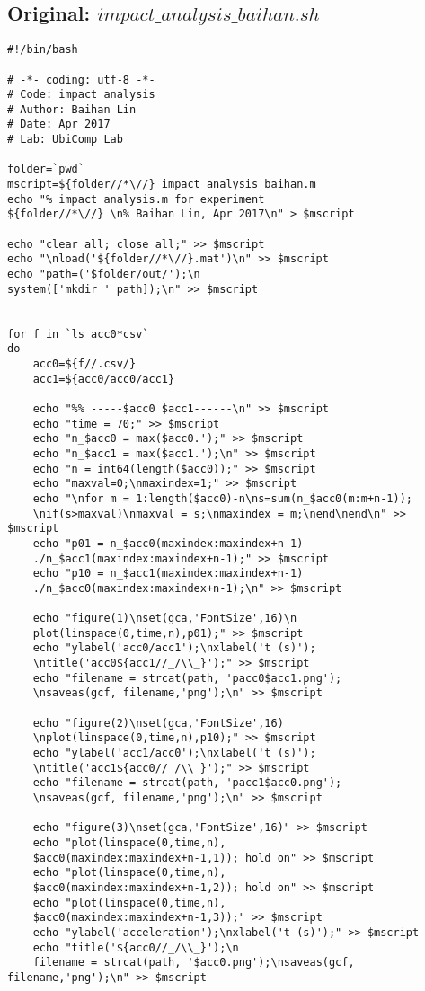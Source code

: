 \documentclass{sigchi}
\begin{document}
\subsection{Original: $impact\_analysis\_baihan.sh$}\label{ss:ipc_ana.sh}
\begin{lstlisting}
#!/bin/bash

# -*- coding: utf-8 -*-
# Code: impact analysis
# Author: Baihan Lin
# Date: Apr 2017
# Lab: UbiComp Lab

folder=`pwd`
mscript=${folder//*\//}_impact_analysis_baihan.m
echo "% impact analysis.m for experiment 
${folder//*\//} \n% Baihan Lin, Apr 2017\n" > $mscript

echo "clear all; close all;" >> $mscript
echo "\nload('${folder//*\//}.mat')\n" >> $mscript
echo "path=('$folder/out/');\n
system(['mkdir ' path]);\n" >> $mscript


for f in `ls acc0*csv`
do
    acc0=${f//.csv/}
    acc1=${acc0/acc0/acc1}

	echo "%% -----$acc0 $acc1------\n" >> $mscript
	echo "time = 70;" >> $mscript
    echo "n_$acc0 = max($acc0.');" >> $mscript
    echo "n_$acc1 = max($acc1.');\n" >> $mscript
    echo "n = int64(length($acc0));" >> $mscript
    echo "maxval=0;\nmaxindex=1;" >> $mscript
    echo "\nfor m = 1:length($acc0)-n\ns=sum(n_$acc0(m:m+n-1));
    \nif(s>maxval)\nmaxval = s;\nmaxindex = m;\nend\nend\n" >> $mscript
    echo "p01 = n_$acc0(maxindex:maxindex+n-1)
    ./n_$acc1(maxindex:maxindex+n-1);" >> $mscript
    echo "p10 = n_$acc1(maxindex:maxindex+n-1)
    ./n_$acc0(maxindex:maxindex+n-1);\n" >> $mscript

	echo "figure(1)\nset(gca,'FontSize',16)\n
    plot(linspace(0,time,n),p01);" >> $mscript
	echo "ylabel('acc0/acc1');\nxlabel('t (s)');
    \ntitle('acc0${acc1//_/\\_}');" >> $mscript
	echo "filename = strcat(path, 'pacc0$acc1.png');
    \nsaveas(gcf, filename,'png');\n" >> $mscript

	echo "figure(2)\nset(gca,'FontSize',16)
    \nplot(linspace(0,time,n),p10);" >> $mscript
	echo "ylabel('acc1/acc0');\nxlabel('t (s)');
    \ntitle('acc1${acc0//_/\\_}');" >> $mscript
	echo "filename = strcat(path, 'pacc1$acc0.png');
    \nsaveas(gcf, filename,'png');\n" >> $mscript

	echo "figure(3)\nset(gca,'FontSize',16)" >> $mscript
	echo "plot(linspace(0,time,n),
    $acc0(maxindex:maxindex+n-1,1)); hold on" >> $mscript
	echo "plot(linspace(0,time,n),
    $acc0(maxindex:maxindex+n-1,2)); hold on" >> $mscript
	echo "plot(linspace(0,time,n),
    $acc0(maxindex:maxindex+n-1,3));" >> $mscript
	echo "ylabel('acceleration');\nxlabel('t (s)');" >> $mscript
	echo "title('${acc0//_/\\_}');\n
    filename = strcat(path, '$acc0.png');\nsaveas(gcf, filename,'png');\n" >> $mscript


\end{lstlisting}
\end{document}
